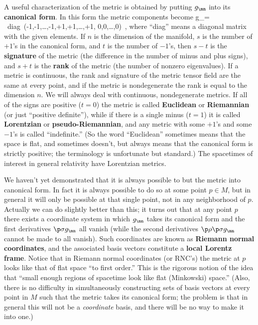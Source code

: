 \documentclass[12pt]{article}
\begin{document}
A useful characterization of the metric is obtained by putting $g_\mn$
into its {\bf canonical form}.  In this form the metric components become
\be
  g_\mn = {\rm ~diag~}(-1,-1,\ldots,-1,+1,+1,\ldots,+1,
  0,0,\ldots,0)\ ,\label{2.34}
\ee
where ``diag'' means a diagonal matrix with the given elements.  If
$n$ is the dimension of the manifold, $s$ is the number of $+1$'s in
the canonical form, and $t$ is the number of $-1$'s, then
$s-t$ is the {\bf signature}
of the metric (the difference in the number of minus and plus signs),
and $s+t$ is the {\bf rank} of the metric (the number of nonzero
eigenvalues).  If a metric is continuous, the rank and signature of
the metric tensor field are the same at every point, and if the metric
is nondegenerate the rank is equal to the dimension $n$.  We will
always deal with continuous, nondegenerate metrics.  If all of the
signs are positive ($t=0$) the metric is called {\bf Euclidean} or
{\bf Riemannian} (or just ``positive definite''), while if there is a 
single minus ($t=1$) it is called {\bf Lorentzian} or 
{\bf pseudo-Riemannian}, and any metric with some $+1$'s and some 
$-1$'s is called ``indefinite.''  (So the word ``Euclidean''
sometimes means that the space is flat, and sometimes doesn't, but
always means that the canonical form is strictly positive; the
terminology is unfortunate but standard.)  The spacetimes of interest
in general relativity have Lorentzian metrics.

We haven't yet demonstrated that it is always possible to but the metric
into canonical form.  In fact it is always
possible to do so at some point $p\in M$, but in general it will only
be possible at that single point, not in any neighborhood of $p$.
Actually we can do slightly better than this; it turns out that at
any point $p$ there exists a coordinate system in which $g_\mn$ takes
its canonical form and the first derivatives $\p\sigma g_\mn$ all vanish 
(while the second derivatives $\p\rho \p\sigma g_\mn$ cannot be made
to all vanish).  Such coordinates are known as {\bf Riemann normal
coordinates}, and  the associated basis vectors constitute
a {\bf local Lorentz frame}.  Notice
that in Riemann normal coordinates (or RNC's) the metric at $p$ looks 
like that of flat space ``to first order.''  This is the rigorous
notion of the idea that ``small enough regions of spacetime look like
flat (Minkowski) space.''  (Also, there is no difficulty in simultaneously
constructing sets of basis vectors at every point in $M$ such that the
metric takes its canonical form; the problem is that in general this
will not be a {\it coordinate} basis, and there will be no way to
make it into one.)
\end{document}
